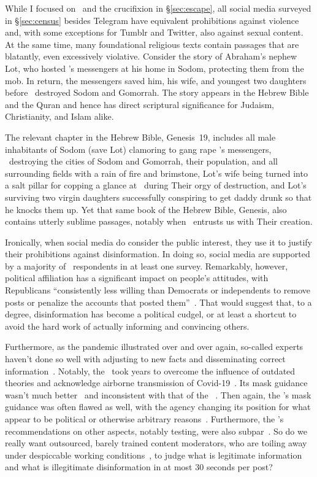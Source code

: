 While I focused on \DALLE\ and the crucifixion in \S\ref{sec:escape}, all social
media surveyed in \S\ref{sec:census} besides Telegram have equivalent
prohibitions against violence and, with some exceptions for Tumblr and Twitter,
also against sexual content. At the same time, many foundational religious texts
contain passages that are blatantly, even excessively violative. Consider the
story of Abraham's nephew Lot, who hosted \YHWH's messengers at his home in
Sodom, protecting them from the mob. In return, the messengers saved him, his
wife, and youngest two daughters before \YHWH\ destroyed Sodom and Gomorrah. The
story appears in the Hebrew Bible and the Quran and hence has direct scriptural
significance for Judaism, Christianity, and Islam alike.

The relevant chapter in the Hebrew Bible, Genesis~19, includes all male
inhabitants of Sodom (save Lot) clamoring to gang rape \YHWH's messengers,
\YHWH\ destroying the cities of Sodom and Gomorrah, their population, and all
surrounding fields with a rain of fire and brimstone, Lot's wife being turned
into a salt pillar for copping a glance at \YHWH\ during Their orgy of
destruction, and Lot's surviving two virgin daughters successfully conspiring to
get daddy drunk so that he knocks them up. Yet that same book of the Hebrew
Bible, Genesis, also contains utterly sublime passages, notably when \YHWH\
entrusts us with Their creation.

Ironically, when social media do consider the public interest, they use it to
justify their prohibitions against disinformation. In doing so, social media are
supported by a majority of \US\ respondents in at least one survey. Remarkably,
however, political affiliation has a significant impact on people's attitudes,
with Republicans ``consistently less willing than Democrats or independents to
remove posts or penalize the accounts that posted
them''~\cite{KozyrevaHerzogea2023}. That would suggest that, to a degree,
disinformation has become a political cudgel, or at least a shortcut to avoid
the hard work of actually informing and convincing others.

Furthermore, as the pandemic illustrated over and over again, so-called experts
haven't done so well with adjusting to new facts and disseminating correct
information~\cite{SinghMcNabea2021}. Notably, the \WHO\ took years to overcome
the influence of outdated theories and acknowledge airborne transmission of
Covid-19~\cite{Chamary2021,GreenhalghOzbilginea2022,JimenezMarrea2022,Lewis2022,SirleafClark2021,SirleafClarkea2021}.
Its mask guidance wasn't much better~\cite{ChanLeungea2020} and inconsistent
with that of the \CDC~\cite{Curtis2020}. Then again, the \CDC's mask guidance
was often flawed as well, with the agency changing its position for what appear
to be political or otherwise arbitrary reasons~\cite{Netburn2021}. Furthermore,
the \CDC's recommendations on other aspects, notably testing, were also
subpar~\cite{Flam2022,Ngo2022,Scott2022}. So do we really want outsourced,
barely trained content moderators, who are toiling away under despiccable
working conditions~\cite{Newton2019b,Newton2019}, to judge what is legitimate
information and what is illegitimate disinformation in at most 30 seconds per
post?

